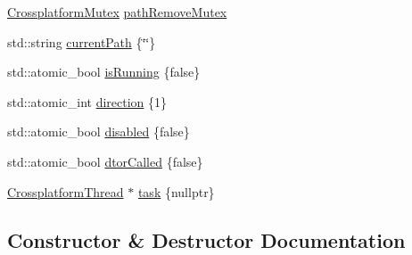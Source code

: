 \begin{DoxyCompactItemize}
\item 
\mbox{\hyperlink{classCrossplatformMutex}{Crossplatform\+Mutex}} \mbox{\hyperlink{classokapi_1_1AsyncLinearMotionProfileController_ac68c8ff11c8a38eca42efd2950584b90}{path\+Remove\+Mutex}}
\item 
std\+::string \mbox{\hyperlink{classokapi_1_1AsyncLinearMotionProfileController_a010cd3afaa58154ee7a32059cadae555}{current\+Path}} \{\char`\"{}\char`\"{}\}
\item 
std\+::atomic\+\_\+bool \mbox{\hyperlink{classokapi_1_1AsyncLinearMotionProfileController_a587f56ae443b18e8fe0b9feeca624b07}{is\+Running}} \{false\}
\item 
std\+::atomic\+\_\+int \mbox{\hyperlink{classokapi_1_1AsyncLinearMotionProfileController_af82aa4936830711c126e7f00222fdbd8}{direction}} \{1\}
\item 
std\+::atomic\+\_\+bool \mbox{\hyperlink{classokapi_1_1AsyncLinearMotionProfileController_a6fc7e4b240646a8e2a8ecc06701e5ee0}{disabled}} \{false\}
\item 
std\+::atomic\+\_\+bool \mbox{\hyperlink{classokapi_1_1AsyncLinearMotionProfileController_aa876f79a2053e1f6b01519f17ccaebfa}{dtor\+Called}} \{false\}
\item 
\mbox{\hyperlink{classCrossplatformThread}{Crossplatform\+Thread}} $\ast$ \mbox{\hyperlink{classokapi_1_1AsyncLinearMotionProfileController_aa49e2d190f4e8af09fdc4b13951c212d}{task}} \{nullptr\}
\end{DoxyCompactItemize}


\subsection{Constructor \& Destructor Documentation}
\mbox{\label{classokapi_1_1AsyncLinearMotionProfileController_a6a5c233fef5c310eaac306467e6a402b}} 
